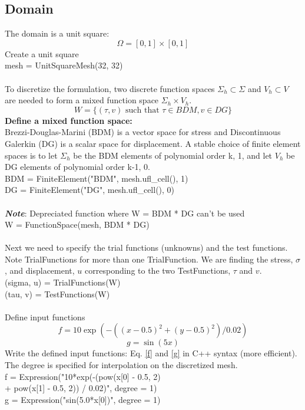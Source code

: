 \documentclass[12pt,3p]{article}
\begin{document}
\subsection{Domain}
The domain is a unit square: 
\[ \Omega = [0,1] \times [0,1] \] 
Create a unit square \\
{\selectfont
mesh = UnitSquareMesh(32, 32) \\ \\
}
To discretize the formulation, two discrete function spaces $\Sigma_h \subset \Sigma$ and $V_h \subset V$ are needed to form a mixed function space $\Sigma_h \times V_h$. \\
\begin{equation*}
W = \{ (\tau, v) \text{ such that } \tau \in BDM, v \in DG \}
\end{equation*}
\textbf{Define a mixed function space:}  \\
Brezzi-Douglas-Marini (BDM) is a vector space for stress and Discontinuous Galerkin (DG) is a scalar space for displacement. A stable choice of finite element spaces is to let $\Sigma_h$ be the BDM elements of polynomial order k, 1, and let $V_h$ be DG elements of polynomial order k-1, 0. \\
{\selectfont
BDM = FiniteElement("BDM", mesh.ufl\_cell(), 1)  \\
DG  = FiniteElement("DG", mesh.ufl\_cell(), 0) \\ \\
}
\textit{\textbf{Note}}: Depreciated function where {\selectfont W = BDM * DG} can't be used \\
{\selectfont
W = FunctionSpace(mesh, BDM * DG) \\ \\
}
Next we need to specify the trial functions (unknowns) and the test functions. Note {\selectfont TrialFunctions} for more than one {\selectfont TrialFunction}. We are finding the stress, $\sigma$, and displacement, $u$ corresponding to the two {\selectfont TestFunctions}, $\tau$ and $v$. \\
{\selectfont
(sigma, u) = TrialFunctions(W) \\
(tau, v) = TestFunctions(W) \\ \\
}
Define input functions \\
\begin{equation}\label{f}
f = 10 \exp (-((x-0.5)^2 +(y -0.5)^2)/0.02)
\end{equation}
\begin{equation}\label{g}
g = \sin (5x)
\end{equation}
Write the defined input functions: Eq. \ref{f} and \ref{g} in C++ syntax (more efficient). The degree is specified for interpolation on the discretized mesh. \\
{\selectfont
f = Expression("10*exp(-(pow(x[0] - 0.5, 2) \\
\indent \indent \indent \indent \indent \indent + pow(x[1] - 0.5, 2)) / 0.02)", degree = 1) \\ 
g = Expression("sin(5.0*x[0])", degree = 1)
}
\end{document}

